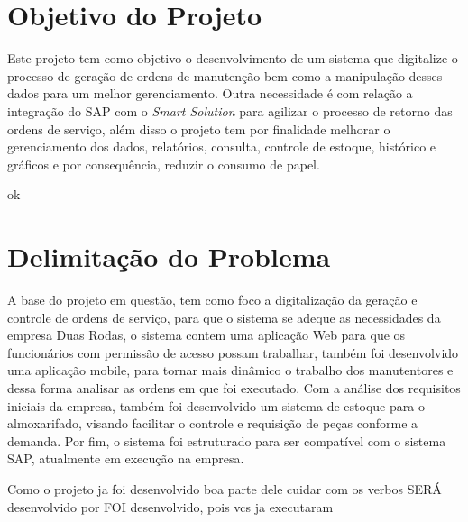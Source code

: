 \section{Objetivo do Projeto}
Este projeto tem como objetivo o desenvolvimento de um sistema que digitalize o processo de geração de ordens de manutenção bem como a manipulação desses dados para um melhor gerenciamento. Outra necessidade é com relação a integração do SAP com o \textit{Smart Solution} para agilizar o processo de retorno das ordens de serviço, além disso o projeto tem por finalidade melhorar o gerenciamento dos dados, relatórios, consulta, controle de estoque, histórico e gráficos e por consequência, reduzir o consumo de papel.

{\color{red} ok}
\section{Delimitação do Problema}

A base do projeto em questão, tem como foco a digitalização da geração e controle de ordens de serviço, para que o sistema se adeque as necessidades da empresa Duas Rodas, o sistema contem uma aplicação Web para que os funcionários com permissão de acesso possam trabalhar, também foi desenvolvido uma aplicação mobile, para tornar mais dinâmico o trabalho dos manutentores e dessa forma analisar as ordens em que foi executado.
Com a análise dos requisitos iniciais da empresa, também foi desenvolvido um sistema de estoque para o almoxarifado, visando facilitar o controle e requisição de peças conforme a demanda. Por fim, o sistema foi estruturado para ser compatível com o sistema SAP, atualmente em execução na empresa.

{\color{red} Como o projeto ja foi desenvolvido boa parte dele cuidar com os verbos SERÁ desenvolvido  por FOI desenvolvido, pois vcs ja executaram}


